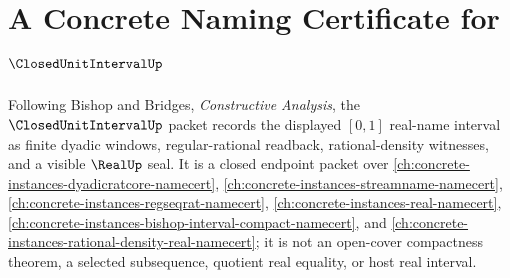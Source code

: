 \chapter{A Concrete Naming Certificate for $\ClosedUnitIntervalUp$}
\label{ch:concrete-instances-closed-unit-interval-namecert}

Following Bishop and Bridges, \emph{Constructive Analysis}, the $\ClosedUnitIntervalUp$ packet records the displayed $[0,1]$ real-name interval as finite dyadic windows, regular-rational readback, rational-density witnesses, and a visible $\RealUp$ seal. It is a closed endpoint packet over \autoref{ch:concrete-instances-dyadicratcore-namecert}, \autoref{ch:concrete-instances-streamname-namecert}, \autoref{ch:concrete-instances-regseqrat-namecert}, \autoref{ch:concrete-instances-real-namecert}, \autoref{ch:concrete-instances-bishop-interval-compact-namecert}, and \autoref{ch:concrete-instances-rational-density-real-namecert}; it is not an open-cover compactness theorem, a selected subsequence, quotient real equality, or host real interval.

